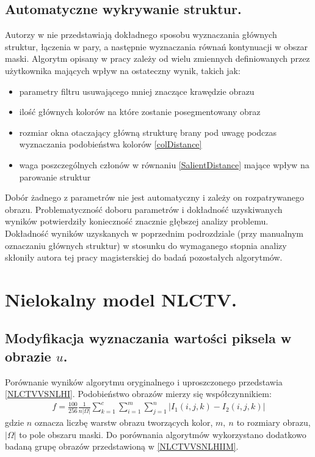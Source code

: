 \documentclass[12pt, twoside, openany]{report}
\theoremstyle{definition}
\begin{document}
\subsection{Automatyczne wykrywanie struktur.}
Autorzy w \cite{SalientStrucTexProp} nie przedstawiają dokładnego sposobu wyznaczania głównych struktur, łączenia w pary, a następnie wyznaczania równań kontynuacji w obszar maski. Algorytm opisany w pracy zależy od wielu zmiennych definiowanych przez użytkownika mających wpływ na ostateczny wynik, takich jak:
\begin{itemize}
\item parametry filtru usuwającego mniej znaczące krawędzie obrazu
\item ilość głównych kolorów na które zostanie posegmentowany obraz
\item rozmiar okna otaczający główną strukturę brany pod uwagę podczas wyznaczania podobieństwa kolorów \eqref{colDistance}
\item waga poszczególnych członów w równaniu \eqref{SalientDistance} mające wpływ na parowanie struktur
\end{itemize}
Dobór żadnego z parametrów nie jest automatyczny i zależy on rozpatrywanego obrazu. Problematyczność doboru parametrów i dokładność uzyskiwanych wyników potwierdziły konieczność znacznie głębszej analizy problemu. Dokładność wyników uzyskanych w poprzednim podrozdziale (przy manualnym oznaczaniu głównych struktur) w stosunku do wymaganego stopnia analizy skłoniły autora tej pracy magisterskiej do badań pozostałych algorytmów.
\section{Nielokalny model NLCTV.}
\subsection{Modyfikacja wyznaczania wartości piksela w obrazie $u$.}
Porównanie wyników algorytmu oryginalnego i uproszczonego przedstawia \autoref{NLCTVVSNLHI}. Podobieństwo obrazów mierzy się współczynnikiem:
\begin{align}
f = \frac{100}{256}\frac{1}{n| \Omega |} \sum^c_{k=1}{\sum^m_{i=1}{\sum^n_{j=1}{ | I_1(i,j,k)-I_2(i,j,k) |}}} %
\end{align}
gdzie $n$ oznacza liczbę warstw obrazu tworzących kolor, $m, \ n$ to rozmiary obrazu, $|\Omega|$ to pole obszaru maski. Do porównania algorytmów wykorzystano dodatkowo badaną grupę obrazów przedstawioną w \autoref{NLCTVVSNLHIIM}.
\end{document}

